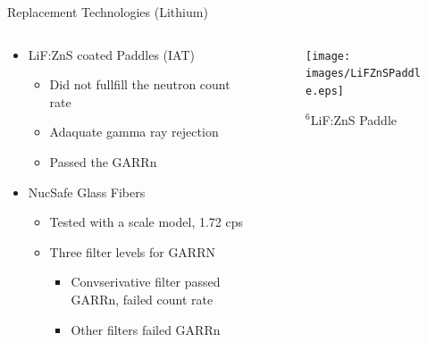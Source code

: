 \documentclass{beamer}
\begin{document}
\begin{frame}{Replacement Technologies (Lithium)}
\begin{columns}[onlytextwidth]
\begin{column}{0.45\textwidth}
\begin{itemize}
	\small
	\item LiF:ZnS coated Paddles (IAT) \cite{kouzes_lithium_2010}
	\begin{itemize}
		\tiny
		\item Did not fullfill the neutron count rate
		\item Adaquate gamma ray rejection
		\item Passed the GARRn
	\end{itemize}
	\small
	\item NucSafe Glass Fibers\cite{kouzes_alternative_2010}
	\begin{itemize}
		\tiny
		\item Tested with a scale model, 1.72 cps
		\item Three filter levels for GARRN
		\begin{itemize}
			\tiny
			\item Convserivative filter passed GARRn, failed count rate
			\item Other filters failed GARRn
		\end{itemize}
	\end{itemize}
\end{itemize}
\end{column}
\begin{column}{0.45\textwidth}
	\begin{figure}
		\texttt{[image: images/LiFZnSPaddle.eps]}
		\caption{${}^6$LiF:ZnS Paddle}
		\label{fig:LifZnSPaddle}

\end{figure}
\end{column}
\end{columns}
\end{frame}
\end{document}
